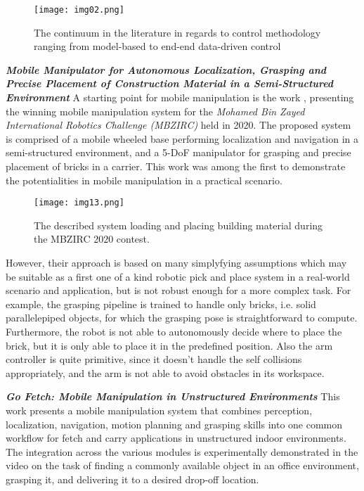 \begin{figure}[H]
	\centering
	\texttt{[image: img02.png]}
	\captionsetup{width=0.6\linewidth}
	\caption{The continuum in the literature in regards to control
		methodology ranging from model-based to end-end data-driven
		control \cite{thakar2023survey}}
	\label{fig:img02}
\end{figure}


\textbf{\textit{Mobile Manipulator for Autonomous Localization,
		Grasping and Precise Placement of Construction
		Material in a Semi-Structured Environment}} \quad
A starting point for mobile manipulation is the work \cite{loianno2021construction},
presenting the winning mobile manipulation system for the \textit{Mohamed
	Bin Zayed International Robotics Challenge (MBZIRC)} held in 2020. The proposed system
is comprised of a mobile wheeled base performing localization and navigation in a
semi-structured environment, and a 5-DoF manipulator for grasping and precise placement
of bricks in a carrier. This work was among the first to demonstrate the potentialities
in mobile manipulation in a practical scenario.

\begin{figure}[H]
	\centering
	\texttt{[image: img13.png]}
	\captionsetup{width=1\linewidth}
	\caption{The described system loading and placing building material
		during the MBZIRC 2020 contest.	\cite{loianno2021construction}}
	\label{fig:img13}
\end{figure}

However, their approach is based on many simplyfying assumptions which may be suitable as a
first one of a kind robotic pick and place system in a real-world scenario and application,
but is not robust enough for a more complex task. For example, the grasping pipeline
is trained to handle only bricks, i.e. solid parallelepiped objects, for which the grasping pose
is straightforward to compute. Furthermore, the robot is not able to autonomously decide
where to place the brick, but it is only able to place it in the predefined position.
Also the arm controller is quite primitive, since it doesn't handle the self collisions
appropriately, and the arm is not able to avoid obstacles in its workspace.

\textbf{\textit{Go Fetch: Mobile Manipulation in Unstructured Environments}} \quad
This work \cite{blomqvist2020gofetch} presents a mobile manipulation system
that combines perception, localization, navigation,
motion planning and grasping skills into one common workflow
for fetch and carry applications in unstructured indoor environments. 
The integration across the various modules is experimentally demonstrated 
in the video \cite{youtube2020gofetch} on the task of finding a commonly available 
object in an office environment, grasping it, 
and delivering it to a desired drop-off location. 

